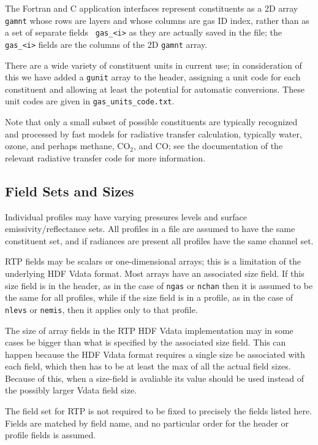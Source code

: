 \documentclass[12pt]{article}
\begin{document}
The Fortran and C application interfaces represent constituents as
a 2D array {\tt gamnt} whose rows are layers and whose columns are
gas ID index, rather than as a set of separate fields {\tt
gas\_<i>} as they are actually saved in the file; the {\tt
gas\_<i>} fields are the columns of the 2D {\tt gamnt} array.

There are a wide variety of constituent units in current use; in
consideration of this we have added a {\tt gunit} array to the
header, assigning a unit code for each constituent and allowing at
least the potential for automatic conversions.  These unit codes are
given in {\tt gas\_units\_code.txt}.

Note that only a small subset of possible constituents are typically
recognized and processed by fast models for radiative transfer
calculation, typically water, ozone, and perhaps methane, CO$_2$,
and CO; see the documentation of the relevant radiative transfer
code for more information.


\subsection{Field Sets and Sizes}

Individual profiles may have varying pressures levels and
surface emissivity/reflectance sets.  All profiles
in a file are assumed to have the same constituent set, and if
radiances are present all profiles have the same channel set.

RTP fields may be scalars or one-dimensional arrays; this is a
limitation of the underlying HDF Vdata format.  Most arrays have an
associated size field.  If this size field is in the header, as in
the case of {\tt ngas} or {\tt nchan} then it is assumed to be the
same for all profiles, while if the size field is in a profile, as
in the case of {\tt nlevs} or {\tt nemis}, then it applies only to
that profile.

The size of array fields in the RTP HDF Vdata implementation may in
some cases be bigger than what is specified by the associated size
field.  This can happen because the HDF Vdata format requires a
single size be associated with each field, which then has to be at
least the max of all the actual field sizes.  Because of this, when
a size-field is avaliable its value should be used instead of the
possibly larger Vdata field size.

The field set for RTP is not required to be fixed to precisely the
fields listed here.  Fields are matched by field name, and no
particular order for the header or profile fields is assumed.
\end{document}
